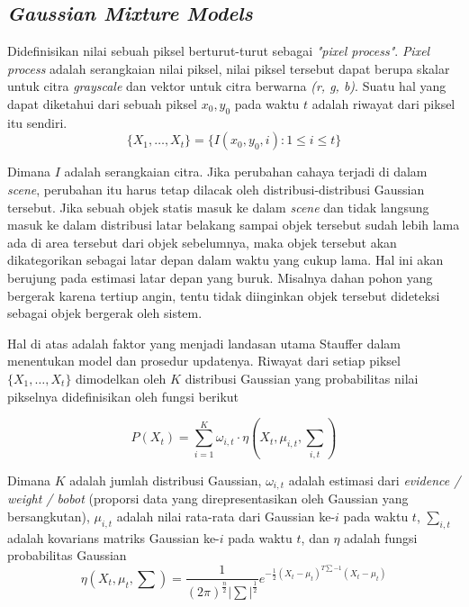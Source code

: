     \subsection{\textit{Gaussian Mixture Models}}
        Didefinisikan nilai sebuah piksel berturut-turut sebagai \textit{"pixel process"}. \textit{Pixel process} adalah serangkaian nilai piksel, nilai piksel tersebut dapat berupa skalar untuk citra \textit{grayscale} dan vektor untuk citra berwarna \textit{(r, g, b)}. Suatu hal yang dapat  diketahui dari sebuah piksel ${x_0, y_0}$ pada waktu $t$ adalah riwayat dari piksel itu sendiri.
        \begin{equation}\label{eq:2.4}
        \{X_1, \ldots, X_t\} = \{I(x_0, y_0, i) : 1 \leq i \leq t\}
        \end{equation}
        
        Dimana $I$ adalah serangkaian citra. Jika perubahan cahaya terjadi di dalam \textit{scene}, perubahan itu harus tetap dilacak oleh distribusi-distribusi Gaussian tersebut. Jika sebuah objek statis masuk ke dalam \textit{scene} dan tidak langsung masuk ke dalam distribusi latar belakang sampai objek tersebut sudah lebih lama ada di area tersebut dari objek sebelumnya, maka objek tersebut akan dikategorikan sebagai latar depan dalam waktu yang cukup lama. Hal ini akan berujung pada estimasi latar depan yang buruk. Misalnya dahan pohon yang bergerak karena tertiup angin, tentu tidak diinginkan objek tersebut dideteksi sebagai objek bergerak oleh sistem.
        
        Hal di atas adalah faktor yang menjadi landasan utama Stauffer dalam menentukan model dan prosedur updatenya. Riwayat dari setiap piksel $\{X_1, \ldots, X_t\}$ dimodelkan oleh $K$ distribusi Gaussian yang probabilitas nilai pikselnya didefinisikan oleh fungsi berikut
        
        \begin{equation}\label{eq:2.5}
        P(X_t) = \sum_{i=1}^K \omega_{i, t} \cdot \eta (X_t, \mu_{i, t}, \text{$\textstyle \sum$}_{i, t})
        \end{equation}
        
        Dimana $K$ adalah jumlah distribusi Gaussian, $\omega_{i, t}$ adalah estimasi dari \textit{evidence / weight / bobot} (proporsi data yang direpresentasikan oleh Gaussian yang bersangkutan), $\mu_{i, t}$ adalah nilai rata-rata dari Gaussian ke-$i$ pada waktu $t$, $\sum_{i, t}$ adalah kovarians matriks Gaussian ke-$i$ pada waktu $t$, dan $\eta$ adalah fungsi probabilitas Gaussian
        \begin{equation}\label{eq:2.6}
        \eta (X_t, \mu_t, \text{$\textstyle \sum$}) = 
        \frac{1}{{(2\pi)^\frac{n}{2} \textstyle |\sum|^\frac{1}{2} }}e^{ - \frac{1}{2} (X_t - \mu_t)^{T \sum{-1} } (X_t - \mu_t)}
        \end{equation}
        \vspace{0.005cm}
        
